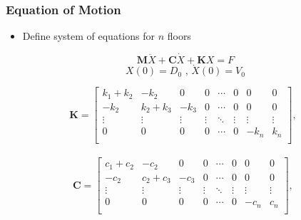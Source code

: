 \documentclass[xcolor=svgnames,9pt]{beamer}
\theoremstyle{remark}
\begin{document}
		\begin{frame}
  			\frametitle{Equation of Motion}
			\begin{itemize}
				\item Define system of equations for $n$ floors
			\end{itemize}
				\begin{framed}
					\begin{equation}\label{MotionEQ}
						\textbf{M}\ddot{X}+\textbf{C}\dot{X}+\textbf{K}X = F
					\end{equation}
					\begin{equation*}
						X(0)=D_0 \text{ , }
						\dot{X}(0)=V_0
					\end{equation*}
				\end{framed}
				\begin{equation*}
					\textbf{K}=
					\begin{bmatrix}
						k_1 + k_2 & -k_2 & 0 & 0 & \cdots & 0 & 0 & 0\\
						-k_2 & k_2 + k_3 & -k_3 & 0 & \cdots & 0 & 0 & 0\\
						\vdots & \vdots & \vdots & \vdots & \ddots & \vdots & \vdots & \vdots \\
						0& 0 & 0 & 0 & \cdots & 0 & -k_{n} & k_{n}\\
					\end{bmatrix},\ \ 
				\end{equation*}\\

				\begin{equation*}
					\textbf{C}=
					\begin{bmatrix}
					           c_1 + c_2 & -c_2 & 0 & 0 & \cdots & 0 & 0 & 0\\
						-c_2 &  c_2 + c_3 & -c_3 & 0 & \cdots & 0 & 0 & 0\\
						\vdots & \vdots & \vdots & \vdots & \ddots & \vdots & \vdots & \vdots \\
						0& 0 & 0 & 0 & \cdots & 0 &-c_{n} & c_{n}\\ 
					\end{bmatrix},\ \ 
				\end{equation*}\\


\end{frame}
\end{document}
